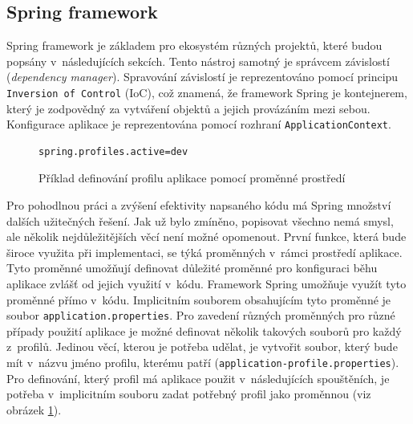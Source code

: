     \subsection{Spring framework}
        Spring framework je základem pro ekosystém různých projektů, které budou popsány v~následujících sekcích.\cite{spring-framework} Tento nástroj samotný je správcem závislostí (\textit{dependency manager}). Spravování závislostí je reprezentováno pomocí principu \texttt{Inversion of Control} (IoC), což znamená, že framework Spring je kontejnerem, který je zodpovědný za vytváření objektů a jejich provázáním mezi sebou. Konfigurace aplikace je reprezentována pomocí rozhraní \texttt{ApplicationContext}.
        
        \begin{figure}
            \begin{verbatim}
spring.profiles.active=dev
            \end{verbatim}
            \caption{Příklad definování profilu aplikace pomocí proměnné prostředí} 
            \label{code:current-spring-profile}
        \end{figure}
        Pro pohodlnou práci a zvýšení efektivity napsaného kódu má Spring množství dalších užitečných řešení. Jak už bylo zmíněno, popisovat všechno nemá smysl, ale několik nejdůležitějších věcí není možné opomenout. První funkce, která bude široce využita při implementaci, se týká proměnných v~rámci prostředí aplikace. Tyto proměnné umožňují definovat důležité proměnné pro konfiguraci běhu aplikace zvlášť od jejich využití v~kódu. Framework Spring umožňuje využít tyto proměnné přímo v~kódu. Implicitním souborem obsahujícím tyto proměnné je soubor \texttt{application.properties}. Pro zavedení různých proměnných pro různé případy použití aplikace je možné definovat několik takových souborů pro každý z~profilů. Jedinou věcí, kterou je potřeba udělat, je vytvořit soubor, který bude mít v~názvu jméno profilu, kterému patří (\texttt{application-{profile}.properties}). Pro definování, který profil má aplikace použit v~následujících spouštěních, je potřeba v~implicitním souboru zadat potřebný profil jako proměnnou (viz obrázek \ref{code:current-spring-profile}). 
        
